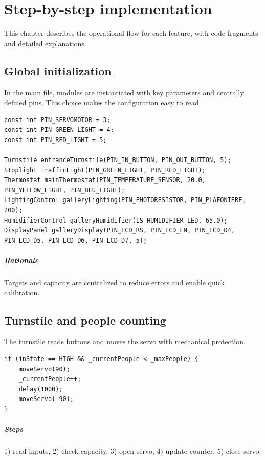 \chapter{Step-by-step implementation}

This chapter describes the operational flow for each feature, with code fragments and detailed explanations.

\section{Global initialization}
In the main file, modules are instantiated with key parameters and centrally defined pins. This choice makes the configuration easy to read.

\begin{lstlisting}[style=cppstyle]
const int PIN_SERVOMOTOR = 3;
const int PIN_GREEN_LIGHT = 4;
const int PIN_RED_LIGHT = 5;

Turnstile entranceTurnstile(PIN_IN_BUTTON, PIN_OUT_BUTTON, 5);
Stoplight trafficLight(PIN_GREEN_LIGHT, PIN_RED_LIGHT);
Thermostat mainThermostat(PIN_TEMPERATURE_SENSOR, 20.0, PIN_YELLOW_LIGHT, PIN_BLU_LIGHT);
LightingControl galleryLighting(PIN_PHOTORESISTOR, PIN_PLAFONIERE, 200);
HumidifierControl galleryHumidifier(IS_HUMIDIFIER_LED, 65.0);
DisplayPanel galleryDisplay(PIN_LCD_RS, PIN_LCD_EN, PIN_LCD_D4, PIN_LCD_D5, PIN_LCD_D6, PIN_LCD_D7, 5);
\end{lstlisting}

\paragraph{Rationale} Targets and capacity are centralized to reduce errors and enable quick calibration.

\section{Turnstile and people counting}
The turnstile reads buttons and moves the servo with mechanical protection.

\begin{lstlisting}[style=cppstyle]
if (inState == HIGH && _currentPeople < _maxPeople) {
    moveServo(90);
    _currentPeople++;
    delay(1000);
    moveServo(-90);
}
\end{lstlisting}

\paragraph{Steps} 1) read inputs, 2) check capacity, 3) open servo, 4) update counter, 5) close servo.


